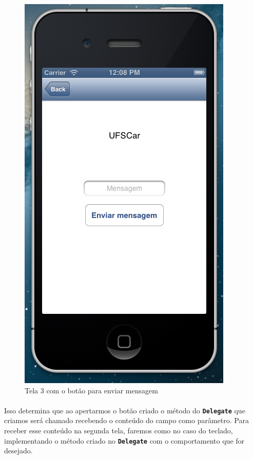 \documentclass[a4paper,12pt,brazil,doubleside]{book}
\begin{document}
\begin{figure}[h]
  \centering
  \includegraphics[totalheight=0.4\textheight]{../figuras/ios/3/simulador3_tela3.png}
  \caption{Tela 3 com o botão para enviar mensagem}
  \label{fig:a}
\end{figure}

\paragraph{}Isso determina que ao apertarmos o botão criado o método do \texttt{\textbf{Delegate}} que criamos será chamado recebendo o conteúdo do campo como parâmetro. Para receber esse conteúdo na segunda tela, faremos como no caso do teclado, implementando o método criado no \texttt{\textbf{Delegate}} com o comportamento que for desejado.
\end{document}
